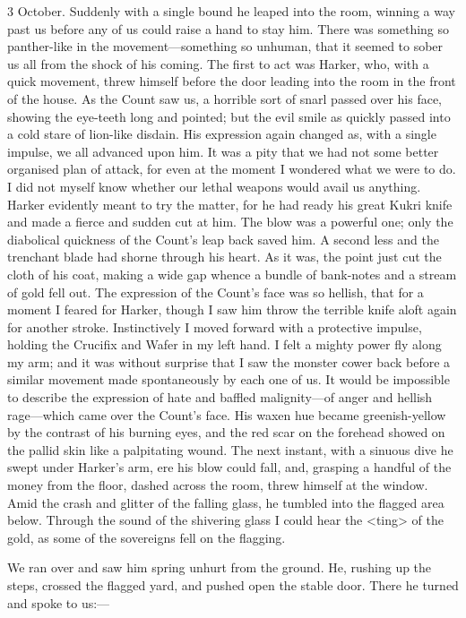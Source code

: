 \begin{diary}{3 October.}
Suddenly with a single bound he leaped into the room, winning a way past us before any of us could raise a hand to stay him. There was something so panther-like in the movement—something so unhuman, that it seemed to sober us all from the shock of his coming. The first to act was Harker, who, with a quick movement, threw himself before the door leading into the room in the front of the house. As the Count saw us, a horrible sort of snarl passed over his face, showing the eye-teeth long and pointed; but the evil smile as quickly passed into a cold stare of lion-like disdain. His expression again changed as, with a single impulse, we all advanced upon him. It was a pity that we had not some better organised plan of attack, for even at the moment I wondered what we were to do. I did not myself know whether our lethal weapons would avail us anything. Harker evidently meant to try the matter, for he had ready his great Kukri knife and made a fierce and sudden cut at him. The blow was a powerful one; only the diabolical quickness of the Count's leap back saved him. A second less and the trenchant blade had shorne through his heart. As it was, the point just cut the cloth of his coat, making a wide gap whence a bundle of bank-notes and a stream of gold fell out. The expression of the Count's face was so hellish, that for a moment I feared for Harker, though I saw him throw the terrible knife aloft again for another stroke. Instinctively I moved forward with a protective impulse, holding the Crucifix and Wafer in my left hand. I felt a mighty power fly along my arm; and it was without surprise that I saw the monster cower back before a similar movement made spontaneously by each one of us. It would be impossible to describe the expression of hate and baffled malignity—of anger and hellish rage—which came over the Count's face. His waxen hue became greenish-yellow by the contrast of his burning eyes, and the red scar on the forehead showed on the pallid skin like a palpitating wound. The next instant, with a sinuous dive he swept under Harker's arm, ere his blow could fall, and, grasping a handful of the money from the floor, dashed across the room, threw himself at the window. Amid the crash and glitter of the falling glass, he tumbled into the flagged area below. Through the sound of the shivering glass I could hear the <ting> of the gold, as some of the sovereigns fell on the flagging.

We ran over and saw him spring unhurt from the ground. He, rushing up the steps, crossed the flagged yard, and pushed open the stable door. There he turned and spoke to us:—


\end{diary}
